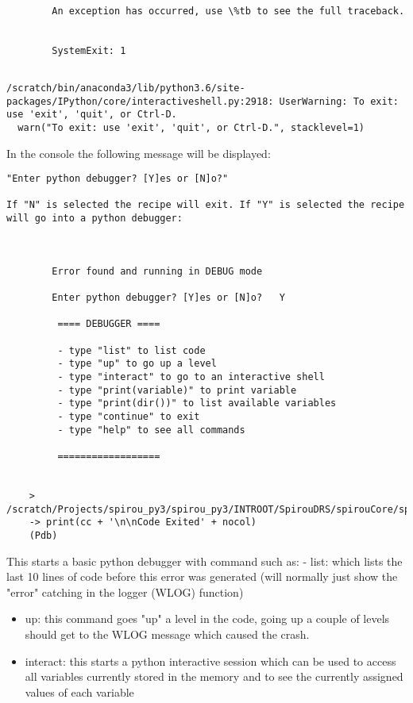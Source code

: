 \documentclass[11pt]{article}
\begin{document}
    \begin{Verbatim}[commandchars=\\\{\}]

        An exception has occurred, use \%tb to see the full traceback.


        SystemExit: 1


    \end{Verbatim}

    \begin{Verbatim}[commandchars=\\\{\}]
/scratch/bin/anaconda3/lib/python3.6/site-packages/IPython/core/interactiveshell.py:2918: UserWarning: To exit: use 'exit', 'quit', or Ctrl-D.
  warn("To exit: use 'exit', 'quit', or Ctrl-D.", stacklevel=1)

    \end{Verbatim}

    In the console the following message will be displayed:

\begin{verbatim}
"Enter python debugger? [Y]es or [N]o?"

If "N" is selected the recipe will exit. If "Y" is selected the recipe will go into a python debugger:



        Error found and running in DEBUG mode

        Enter python debugger? [Y]es or [N]o?   Y

         ==== DEBUGGER ====

         - type "list" to list code
         - type "up" to go up a level
         - type "interact" to go to an interactive shell
         - type "print(variable)" to print variable
         - type "print(dir())" to list available variables
         - type "continue" to exit
         - type "help" to see all commands

         ==================


    > /scratch/Projects/spirou_py3/spirou_py3/INTROOT/SpirouDRS/spirouCore/spirouLog.py(217)debug_start()
    -> print(cc + '\n\nCode Exited' + nocol)
    (Pdb) 
\end{verbatim}

This starts a basic python debugger with command such as: - list: which
lists the last 10 lines of code before this error was generated (will
normally just show the "error" catching in the logger (WLOG) function)

\begin{itemize}
\item
  up: this command goes "up" a level in the code, going up a couple of
  levels should get to the WLOG message which caused the crash.
\item
  interact: this starts a python interactive session which can be used
  to access all variables currently stored in the memory and to see the
  currently assigned values of each variable
\end{itemize}
\end{document}
